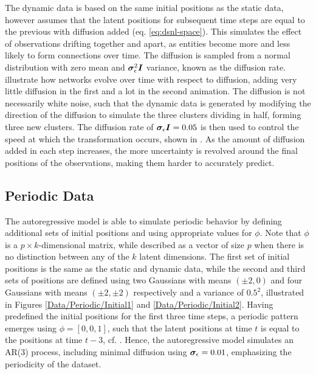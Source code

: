     The dynamic data is based on the same initial positions as the static data, however assumes that the latent positions for subsequent time steps are equal to the previous with diffusion added (eq. \ref{eq:dsnl-space}). This simulates the effect of observations drifting together and apart, as entities become more and less likely to form connections over time. The diffusion is sampled from a normal distribution with zero mean and $\bm{\sigma}_\epsilon^2\bm{I}$ variance, known as the diffusion rate.  illustrate how networks evolve over time with respect to diffusion, adding very little diffusion in the first and a lot in the second animation.
    The diffusion is not necessarily white noise, such that the dynamic data is generated by modifying the direction of the diffusion to simulate the three clusters dividing in half, forming three new clusters. The diffusion rate of $\bm{\sigma}_\epsilon\bm{I}=0.05$ is then used to control the speed at which the transformation occurs, shown in . 
    As the amount of diffusion added in each step increases, the more uncertainty is revolved around the final positions of the observations, making them harder to accurately predict.

\subsection{Periodic Data}

    The autoregressive model is able to simulate periodic behavior by defining additional sets of initial positions and using appropriate values for $\phi$. Note that $\phi$ is a $p\times k$-dimensional matrix, while described as a vector of size $p$ when there is no distinction between any of the $k$ latent dimensions.
    The first set of initial positions is the same as the static and dynamic data, while the second and third sets of positions are defined using two Gaussians with means $(\pm2,0)$ and four Gaussians with means $(\pm2,\pm2)$ respectively and a variance of $0.5^2$, illustrated in Figures \ref{Data/Periodic/Initial1} and \ref{Data/Periodic/Initial2}.
    Having predefined the initial positions for the first three time steps, a periodic pattern emerges using $\phi=[0, 0, 1]$, such that the latent positions at time $t$ is equal to the positions at time $t-3$, cf. .
    Hence, the autoregressive model simulates an AR(3) process, including minimal diffusion using $\bm{\sigma}_\epsilon=0.01$, emphasizing the periodicity of the dataset.
    
